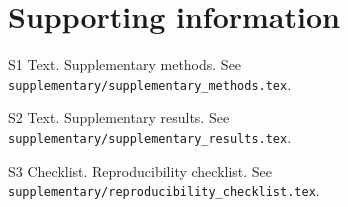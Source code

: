 \documentclass[10pt,letterpaper]{article}
\begin{document}
\clearpage
{}











\section*{Supporting information}
S1 Text. Supplementary methods. See \texttt{supplementary/supplementary\_methods.tex}.

S2 Text. Supplementary results. See \texttt{supplementary/supplementary\_results.tex}.

S3 Checklist. Reproducibility checklist. See \texttt{supplementary/reproducibility\_checklist.tex}.


\end{document}
